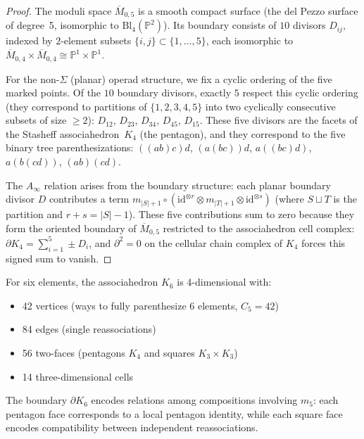\begin{proof}
The moduli space $\overline{M}_{0,5}$ is a smooth compact surface
(the del Pezzo surface of degree~5, isomorphic to
$\mathrm{Bl}_4(\mathbb{P}^2)$).  Its boundary consists of $10$
divisors $D_{ij}$, indexed by $2$-element subsets $\{i,j\} \subset
\{1,\ldots,5\}$, each isomorphic to $\overline{M}_{0,4} \times
\overline{M}_{0,4} \cong \mathbb{P}^1 \times \mathbb{P}^1$.

For the non-$\Sigma$ (planar) operad structure, we fix a cyclic ordering
of the five marked points.  Of the $10$ boundary divisors, exactly $5$
respect this cyclic ordering (they correspond to partitions of
$\{1,2,3,4,5\}$ into two cyclically consecutive subsets of size
$\geq 2$): $D_{12}$, $D_{23}$, $D_{34}$, $D_{45}$, $D_{15}$.
These five divisors are the facets of the Stasheff associahedron~$K_4$
(the pentagon), and they correspond to the five binary tree
parenthesizations:
$((ab)c)d$, $(a(bc))d$, $a((bc)d)$, $a(b(cd))$, $(ab)(cd)$.

The $A_\infty$ relation arises from the boundary structure: each
planar boundary divisor $D$ contributes a term
$m_{|S|+1} \circ (\mathrm{id}^{\otimes r} \otimes m_{|T|+1}
\otimes \mathrm{id}^{\otimes s})$ (where $S \sqcup T$ is the
partition and $r + s = |S| - 1$).  These five contributions sum
to zero because they form the oriented boundary of $\overline{M}_{0,5}$
restricted to the associahedron cell complex:
$\partial K_4 = \sum_{i=1}^5 \pm D_i$, and $\partial^2 = 0$ on
the cellular chain complex of $K_4$ forces this signed sum to vanish.
\end{proof}

\begin{theorem}\label{thm:higher-associahedron-m5}
For six elements, the associahedron $K_6$ is 4-dimensional with:
\begin{itemize}
\item 42 vertices (ways to fully parenthesize 6 elements, $C_5 = 42$)
\item 84 edges (single reassociations)
\item 56 two-faces (pentagons $K_4$ and squares $K_3 \times K_3$)
\item 14 three-dimensional cells
\end{itemize}

The boundary $\partial K_6$ encodes relations among compositions involving $m_5$: each pentagon face corresponds to a local pentagon identity, while each square face encodes compatibility between independent reassociations.
\end{theorem}

